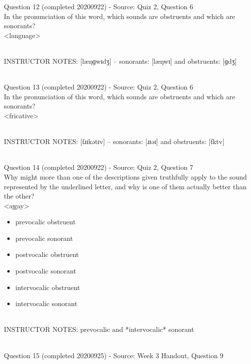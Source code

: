 \documentclass[12pt]{article}
\begin{document}
{\large Question 12} (completed 20200922) - Source: Quiz 2, Question 6\\

In the pronunciation of this word, which sounds are obstruents and which are sonorants?\\

<language>


~\\
INSTRUCTOR NOTES: [læŋɡwɪdʒ] -- sonorants: [læŋwɪ] and obstruents: [ɡdʒ]


~\\

{\large Question 13} (completed 20200922) - Source: Quiz 2, Question 6\\

In the pronunciation of this word, which sounds are obstruents and which are sonorants?\\

<fricative>


~\\
INSTRUCTOR NOTES: [fɹɪkətɪv] -- sonorants: [ɹɪəɪ] and obstruents: [fktv]


~\\

{\large Question 14} (completed 20200922) - Source: Quiz 2, Question 7\\

Why might more than one of the descriptions given truthfully apply to the sound represented by the underlined letter, and why is one of them actually better than the other?\\

<a\underline{w}ay>

\begin{itemize} \item prevocalic obstruent \item prevocalic sonorant \item postvocalic obstruent \item postvocalic sonorant \item intervocalic obstruent \item intervocalic sonorant \end{itemize}


~\\
INSTRUCTOR NOTES: prevocalic and *intervocalic* sonorant


~\\

{\large Question 15} (completed 20200925) - Source: Week 3 Handout, Question 9\\
\end{document}
